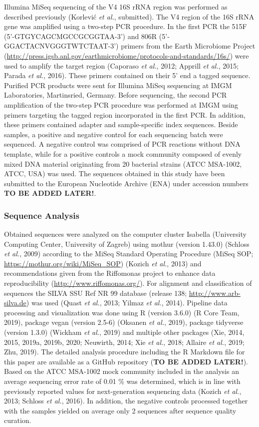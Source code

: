 \documentclass[12pt,]{article}
\begin{document}
Illumina MiSeq sequencing of the V4 16S rRNA region was performed as
described previously (Korlević \emph{et al.}, submitted). The V4 region
of the 16S rRNA gene was amplified using a two-step PCR procedure. In
the first PCR the 515F (5'-GTGYCAGCMGCCGCGGTAA-3') and 806R
(5'-GGACTACNVGGGTWTCTAAT-3') primers from the Earth Microbiome Project
(\url{http://press.igsb.anl.gov/earthmicrobiome/protocols-and-standards/16s/})
were used to amplify the target region (Caporaso \emph{et al.}, 2012;
Apprill \emph{et al.}, 2015; Parada \emph{et al.}, 2016). These primers
contained on their 5' end a tagged sequence. Purified PCR products were
sent for Illumina MiSeq sequencing at IMGM Laboratories, Martinsried,
Germany. Before sequencing, the second PCR amplification of the two-step
PCR procedure was performed at IMGM using primers targeting the tagged
region incorporated in the first PCR. In addition, these primers
contained adapter and sample-specific index sequences. Beside samples, a
positive and negative control for each sequencing batch were sequenced.
A negative control was comprised of PCR reactions without DNA template,
while for a positive controls a mock community composed of evenly mixed
DNA material originating from 20 bacterial strains (ATCC MSA-1002, ATCC,
USA) was used. The sequences obtained in this study have been submitted
to the European Nucleotide Archive (ENA) under accession numbers
\textbf{TO BE ADDED LATER!}.

\hypertarget{sequence-analysis}{%
\subsubsection{Sequence Analysis}\label{sequence-analysis}}

Obtained sequences were analyzed on the computer cluster Isabella
(University Computing Center, University of Zagreb) using mothur
(version 1.43.0) (Schloss \emph{et al.}, 2009) according to the MiSeq
Standard Operating Procedure (MiSeq SOP;
\url{https://mothur.org/wiki/MiSeq_SOP}) (Kozich \emph{et al.}, 2013)
and recommendations given from the Riffomonas project to enhance data
reproducibility (\url{http://www.riffomonas.org/}). For alignment and
classification of sequences the SILVA SSU Ref NR 99 database (release
138; \url{http://www.arb-silva.de}) was used (Quast \emph{et al.}, 2013;
Yilmaz \emph{et al.}, 2014). Pipeline data processing and visualization
was done using R (version 3.6.0) (R Core Team, 2019), package vegan
(version 2.5-6) (Oksanen \emph{et al.}, 2019), package tidyverse
(version 1.3.0) (Wickham \emph{et al.}, 2019) and multiple other
packages (Xie, 2014, 2015, 2019a, 2019b, 2020; Neuwirth, 2014; Xie
\emph{et al.}, 2018; Allaire \emph{et al.}, 2019; Zhu, 2019). The
detailed analysis procedure including the R Markdown file for this paper
are available as a GitHub repository (\textbf{TO BE ADDED LATER!}).
Based on the ATCC MSA-1002 mock community included in the analysis an
average sequencing error rate of 0.01 \si{\percent} was determined,
which is in line with previously reported values for next-generation
sequencing data (Kozich \emph{et al.}, 2013; Schloss \emph{et al.},
2016). In addition, the negative controls processed together with the
samples yielded on average only 2 sequences after sequence quality
curation.
\end{document}

